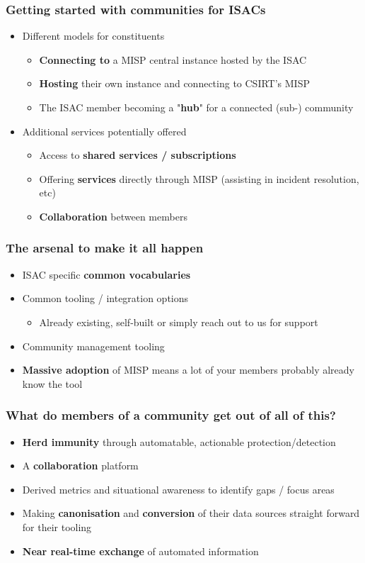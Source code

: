 \begin{frame}
\frametitle{Getting started with communities for ISACs}
\begin{itemize}
	\item Different models for constituents
	\begin{itemize}
        \item {\bf Connecting to} a MISP central instance hosted by the ISAC
        \item {\bf Hosting} their own instance and connecting to CSIRT's MISP
        \item The ISAC member becoming a "{\bf hub}" for a connected (sub-) community 
	\end{itemize}
	\item Additional services potentially offered
	\begin{itemize}
		\item Access to {\bf shared services / subscriptions}
		\item Offering {\bf services} directly through MISP (assisting in incident resolution, etc)
		\item {\bf Collaboration} between members
	\end{itemize}
\end{itemize}
\end{frame}

\begin{frame}
\frametitle{The arsenal to make it all happen}
\begin{itemize}
	\item ISAC specific {\bf common vocabularies}
        \item Common tooling / integration options
	\begin{itemize}
        \item Already existing, self-built or simply reach out to us for support
        \end{itemize}
        \item Community management tooling
        \item {\bf Massive adoption} of MISP means a lot of your members probably already know the tool
\end{itemize}
\end{frame}

\begin{frame}
\frametitle{What do members of a community get out of all of this?}
    \begin{itemize}
        \item {\bf Herd immunity} through automatable, actionable protection/detection
        \item A {\bf collaboration} platform
        \item Derived metrics and situational awareness to identify gaps / focus areas
        \item Making {\bf canonisation} and {\bf conversion} of their data sources straight forward for their tooling
        \item {\bf Near real-time exchange} of automated information
    \end{itemize}
\end{frame}

